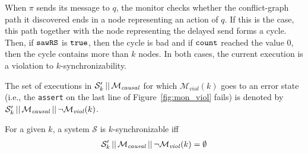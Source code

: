 When $\pi$ sends its message to $q$, the monitor checks whether the conflict-graph path it discovered ends in a node representing an action of $q$. If this is the case, this path together with the node representing the delayed send forms a cycle. Then, if ${\tt sawRS}$ is ${\tt true}$, then the cycle is bad and if ${\tt count}$ reached the value $0$, then the cycle contains more than $k$ nodes. In both cases, the current execution is a violation to $k$-synchronizability.

The set of executions in $\mathcal{S}_k' \,||\,\mathcal{M}_{\mathit{causal}}$ for which $\mathcal{M}_{\mathit{viol}}(k)$ goes to an error state (i.e., the {\tt assert} on the last line of Figure~\ref{fig:mon_viol} fails) is denoted by $\mathcal{S}_k' \,||\,\mathcal{M}_{\mathit{causal}}\,||\, \neg \mathcal{M}_{\mathit{viol}}(k)$.

\begin{theorem}\label{th:main-verif}
For a given $k$, a system $\mathcal{S}$ is $k$-synchronizable iff 
\begin{align*}
\mathcal{S}_k' \,||\,\mathcal{M}_{\mathit{causal}}\,||\, \neg \mathcal{M}_{\mathit{viol}}(k)=\emptyset
\end{align*}
\end{theorem}








